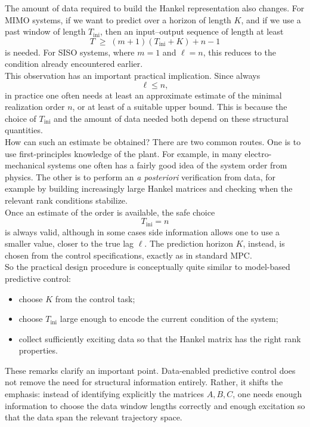 The amount of data required to build the Hankel representation also changes. For MIMO systems, if we want to predict over a horizon of length \(K\), and if we use a past window of length \(T_{\mathrm{ini}}\), then an input--output sequence of length at least
\[
T\;\geq\;(m+1)(T_{\mathrm{ini}}+K)+n-1
\]
is needed. For SISO systems, where \(m=1\) and \(\ell=n\), this reduces to the condition already encountered earlier.\\
This observation has an important practical implication. Since always
\[
\ell\leq n,
\]
in practice one often needs at least an approximate estimate of the minimal realization order \(n\), or at least of a suitable upper bound. This is because the choice of \(T_{\mathrm{ini}}\) and the amount of data needed both depend on these structural quantities.\\

How can such an estimate be obtained? There are two common routes. One is to use first-principles knowledge of the plant. For example, in many electro-mechanical systems one often has a fairly good idea of the system order from physics. The other is to perform an \emph{a posteriori} verification from data, for example by building increasingly large Hankel matrices and checking when the relevant rank conditions stabilize.\\
Once an estimate of the order is available, the safe choice
\[
T_{\mathrm{ini}}=n
\]
is always valid, although in some cases side information allows one to use a smaller value, closer to the true lag \(\ell\). The prediction horizon \(K\), instead, is chosen from the control specifications, exactly as in standard MPC.\\

So the practical design procedure is conceptually quite similar to model-based predictive control:
\begin{itemize}
    \item choose \(K\) from the control task;
    \item choose \(T_{\mathrm{ini}}\) large enough to encode the current condition of the system;
    \item collect sufficiently exciting data so that the Hankel matrix has the right rank properties.
\end{itemize}
These remarks clarify an important point. Data-enabled predictive control does not remove the need for structural information entirely. Rather, it shifts the emphasis: instead of identifying explicitly the matrices \(A,B,C\), one needs enough information to choose the data window lengths correctly and enough excitation so that the data span the relevant trajectory space.\\
